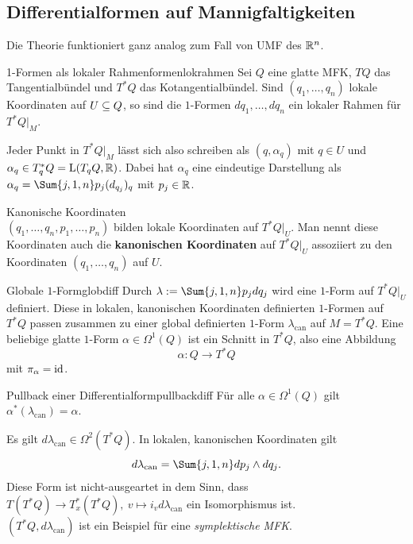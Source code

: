 \subsection{Differentialformen auf Mannigfaltigkeiten}
\label{subsec:diffformen}
Die Theorie funktioniert ganz analog zum Fall von UMF des $\mathbb{R}^n$.
\begin{satz}{1-Formen als lokaler Rahmen}{formenlokrahmen}
Sei $Q$ eine glatte MFK, $TQ$ das Tangentialbündel und $T^\ast Q$ das Kotangentialbündel. Sind $(q_1, \dots, q_n)$ lokale Koordinaten auf $U \subseteq Q$, so sind die $1$-Formen $dq_1, \dots, dq_n$ ein lokaler Rahmen für $T^\ast Q|_M$.
\end{satz}
Jeder Punkt in $T^\ast Q|_M$ lässt sich also schreiben als $(q, \alpha_q)$ mit $q \in U$ und $\alpha_q \in T^\ast_q Q = \text{L}(T_q Q, \mathbb{R})$. Dabei hat $\alpha_q$ eine eindeutige Darstellung als $\alpha_q = \Sum{j,1,n} p_j (d_{q_j})_q$ mit $p_j \in \mathbb{R}$.
\begin{bemerkung}Kanonische Koordinaten\\
$(q_1, \dots, q_n, p_1, \dots, p_n)$ bilden lokale Koordinaten auf $T^\ast Q|_U$. Man nennt diese Koordinaten auch die \textbf{kanonischen Koordinaten} auf $T^\ast Q|_U$ assoziiert zu den Koordinaten $(q_1, \dots, q_n)$ auf $U$.
\end{bemerkung}
\begin{satz}{Globale $1$-Form}{globdiff}
Durch $\lambda := \Sum{j,1,n} p_j dq_j$ wird eine $1$-Form auf $T^\ast Q|_U$ definiert. Diese in lokalen, kanonischen Koordinaten definierten $1$-Formen auf $T^\ast Q$ passen zusammen zu einer global definierten $1$-Form $\lambda_{\text{can}}$ auf $M = T^\ast Q$. Eine beliebige glatte $1$-Form $\alpha \in \Omega^1(Q)$ ist ein Schnitt in $T^\ast Q$, also eine Abbildung 
\begin{equation}
\alpha: Q \to T^\ast Q
\end{equation}
mit $\pi_\alpha = \text{id}$.
\end{satz}
\begin{satz}{Pullback einer Differentialform}{pullbackdiff}
Für alle $\alpha \in \Omega^1 (Q)$ gilt $\alpha^\ast (\lambda_{\text{can}}) = \alpha$.
\end{satz}
\begin{bemerkung}
Es gilt $d\lambda_\text{can} \in \Omega^2(T^\ast Q)$. In lokalen, kanonischen Koordinaten gilt
\begin{equation}
d \lambda_\text{can} = \Sum{j,1,n} dp_j \wedge dq_j.
\end{equation}
Diese Form ist nicht-ausgeartet in dem Sinn, dass $T(T^\ast Q) \to T_x^\ast(T^\ast Q), \ v \mapsto i_v d \lambda_\text{can}$ ein Isomorphismus ist.\\
$(T^\ast Q, d \lambda_\text{can})$ ist ein Beispiel für eine \textit{symplektische MFK}.
\end{bemerkung}
